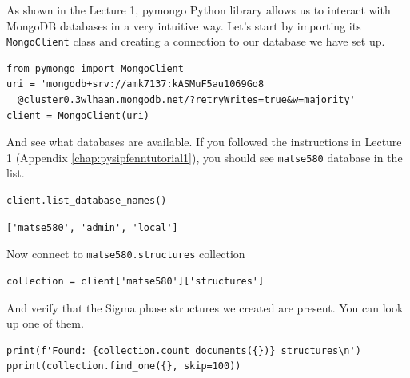 \label{pysipfenntutorial2:verify-the-connection-to-the-database}

As shown in the Lecture 1, pymongo Python library allows us to interact
with MongoDB databases in a very intuitive way. Let's start by importing
its \texttt{MongoClient} class and creating a
connection to our database we have set up.

\begin{verbatim}
from pymongo import MongoClient
uri = 'mongodb+srv://amk7137:kASMuF5au1069Go8
  @cluster0.3wlhaan.mongodb.net/?retryWrites=true&w=majority'
client = MongoClient(uri)
\end{verbatim}

And see what databases are available. If you followed the instructions
in Lecture 1 (Appendix \ref{chap:pysipfenntutorial1}), you should see \texttt{matse580} database
in the list.

\begin{verbatim}
client.list_database_names()
\end{verbatim}

\begin{verbatim}
['matse580', 'admin', 'local']
\end{verbatim}

Now connect to \texttt{matse580.structures} collection

\begin{verbatim}
collection = client['matse580']['structures']
\end{verbatim}

And verify that the Sigma phase structures we created are present. You can look up one of them.

\begin{verbatim}
print(f'Found: {collection.count_documents({})} structures\n')
pprint(collection.find_one({}, skip=100))
\end{verbatim}

